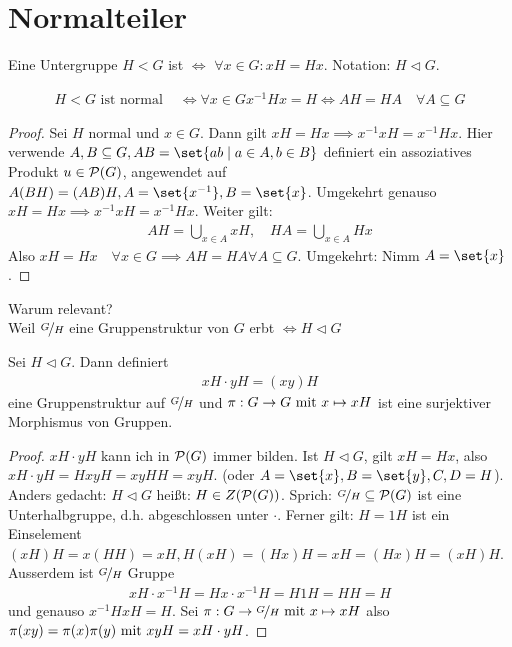 \section{Normalteiler}
\begin{definition}
	Eine Untergruppe $H < G$ ist  $\Leftrightarrow$ $\forall x \in G\colon xH = Hx$. Notation: $H \lhd G$.
\end{definition}
\begin{proposition}
	\begin{align*}
		H < G \text{ ist normal } &\Leftrightarrow \forall x \in G x^{-1}Hx = H \Leftrightarrow AH = HA \quad \forall A \subseteq G
	\end{align*}
\end{proposition}
\begin{proof}
	Sei $H$ normal und $x \in G$. Dann gilt $xH = Hx \implies x^{-1}xH = x^{-1}Hx$. Hier verwende $A,B \subseteq G, AB = \set{ab \mid a \in A, b \in B}$ definiert ein assoziatives Produkt $u \in \powerset(G)$, angewendet auf $A(BH) = (AB)H, A = \set{x^{-1}}, B=\set{x}$. Umgekehrt genauso $xH = Hx \implies x^{-1}xH = x^{-1}Hx$. Weiter gilt:
	\begin{align*}
		AH = \bigcup_{x \in A} x H, \quad HA = \bigcup_{x \in A} Hx
	\end{align*}
	Also $xH = Hx\quad \forall x \in G \implies AH=HA \forall A \subseteq G$. Umgekehrt: Nimm $A = \set{x}$.
\end{proof}
Warum relevant?\\
Weil $\lnkset{G}{H}$ eine Gruppenstruktur von $G$ erbt $\Leftrightarrow H \lhd G$
\begin{proposition}
	\label{1_4_3_prop}
	Sei $H \lhd G$. Dann definiert
	\begin{align*}
		xH \cdot yH = (xy)H
	\end{align*}
	eine Gruppenstruktur auf $\lnkset{G}{H}$ und $\pi: G \to G \mit x \mapsto xH$ ist eine surjektiver Morphismus von Gruppen.
\end{proposition}
\begin{proof}
	$xH \cdot yH$ kann ich in $\powerset(G)$ immer bilden. Ist $H \lhd G$, gilt $xH = Hx$, also $xH\cdot yH = HxyH = xyHH = xyH$. (oder $A=\set{x}, B = \set{y}, C,D=H$). Anders gedacht: $H \lhd G$ heißt: $H \in Z(\powerset(G))$. Sprich: $\lnkset{G}{H} \subseteq \powerset(G)$ ist eine Unterhalbgruppe, d.h. abgeschlossen unter $\cdot$. Ferner gilt: $H = 1H$ ist ein Einselement $(xH)H = x(HH) = xH, H(xH) = (Hx)H = xH=(Hx)H=(xH)H$. Ausserdem ist $\lnkset{G}{H}$ Gruppe 
	\begin{align*}
		xH \cdot x^{-1}H = Hx\cdot x^{-1}H = H1H = HH = H
	\end{align*}
	und genauso $x^{-1}HxH = H$. Sei $\pi: G \to \lnkset{G}{H} \mit x \mapsto xH$ also $\pi(xy) = \pi(x)\pi(y) \mit xyH = xH \cdot yH$.
\end{proof}

